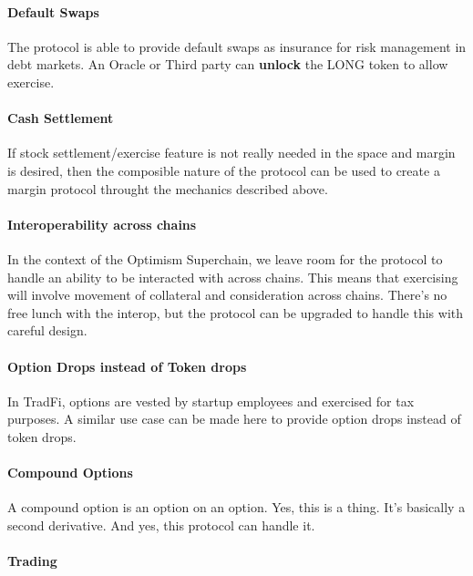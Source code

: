 \paragraph*{Default Swaps}

The protocol is able to provide default swaps as insurance for risk management in debt markets. 
An Oracle or Third party can \textbf{unlock} the LONG token to allow exercise.

\paragraph*{Cash Settlement}
If stock settlement/exercise feature is not really needed in the space and margin is desired, 
then the composible nature of the protocol can be used to create a margin protocol throught the mechanics described above. 


\paragraph*{Interoperability across chains}

In the context of the Optimism Superchain, we leave room for the protocol to handle an ability to be interacted with across chains.
This means that exercising will involve movement of collateral and consideration across chains.
There's no free lunch with the interop, but the protocol can be upgraded to handle this with careful design.

\paragraph*{Option Drops instead of Token drops}
In TradFi, options are vested by startup employees and exercised for tax purposes.
A similar use case can be made here to provide option drops instead of token drops.

\paragraph*{Compound Options}
A compound option is an option on an option. Yes, this is a thing. It's basically a second derivative.
And yes, this protocol can handle it. 







\paragraph*{Trading}

